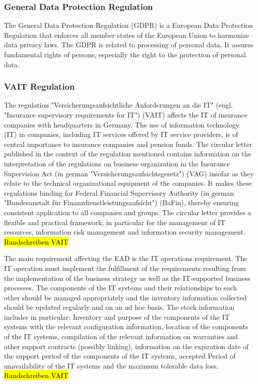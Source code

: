 \subsubsection{General Data Protection Regulation}

The General Data Protection Regulation (GDPR) is a European Data Protection Regulation that enforces all member states of the European Union to harmonize data privacy laws. The GDPR is related to processing of personal data. It assures fundamental rights of  persons, especially the right to the protection of personal data.

\subsubsection{VAIT Regulation}

The regulation "Versicherungsaufsichtliche Anforderungen an die IT" (engl. "Insurance supervisory requirements for IT") (VAIT) affects the IT of insurance companies with headquarters in Germany. The use of information technology (IT) in companies, including IT services offered by IT service providers, is of central importance to insurance companies and pension funds. The circular letter published in the context of the regulation mentioned contains information on the interpretation of the regulations on business organization in the Insurance Supervision Act  (in german "Versicherungsaufsichtsgesetz") (VAG) insofar as they relate to the technical organizational equipment of the companies. It makes these regulations binding for Federal Financial Supervisory Authority (in german "Bundesanstalt für Finanzdienstleistungsaufsicht") (BaFin), thereby ensuring consistent application to all companies and groups. The circular letter provides a flexible and practical framework, in particular for the management of IT resources, information risk management and information security management. \hl{Rundschreiben VAIT}

The main requirement affecting the EAD is the IT operations requirement. The IT operation must implement the fulfillment of the requirements resulting from the implementation of the business strategy as well as the IT-supported business processes. The components of the IT systems and their relationships to each other should be managed appropriately and the inventory information collected should be updated regularly and on an ad hoc basis. The stock information includes in particular: Inventory and purpose of the components of the IT systems with the relevant configuration information, location of the components of the IT systems, compilation of the relevant information on warranties and other support contracts (possibly linking), information on the expiration date of the support period of the components of the IT systems, accepted Period of unavailability of the IT systems and the maximum tolerable data loss. \hl{Rundschreiben VAIT}

